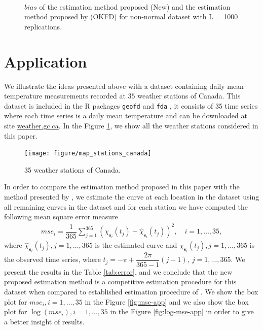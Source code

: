 \documentclass[12pt]{interact}
\theoremstyle{plain}%
\theoremstyle{definition}
\theoremstyle{remark}
\begin{document}
\begin{figure}[p]
	\\
	\caption{$bias$ of the estimation method proposed (New) and the estimation method proposed by \cite{giraldo2011ordinary} (OKFD) for non-normal dataset with L = 1000 replications.}
\end{figure}

\section{Application}\label{sec:application}

We illustrate the ideas presented above with a dataset containing daily mean temperature measurements recorded at \(35\) weather stations of Canada. This dataset is included in the R packages \texttt{geofd} \citep{ramsay2018} and \texttt{fda} \citep{giraldo2012geofd}, it consists of 35 time series where each time series is a daily mean temperature and can be downloaded at site \href{https://weather.gc.ca/}{weather.gc.ca}. In the Figure \ref{fig:weather-stations}, we show all the weather stations
considered in this paper.
\begin{figure}[htbp]
	\centering
	\texttt{[image: figure/map\_stations\_canada]} 
	\caption{35 weather stations  of Canada.}
	\label{fig:weather-stations}
\end{figure}

In order to compare the estimation method proposed in this paper with the method presented by \citet{giraldo2011ordinary}, we estimate the curve at each location in the dataset using all remaining curves in the dataset and for each station we have computed the following mean square error measure
\begin{align*}
mse_i = \dfrac{1}{365} \sum_{j=1}^{365} (\chi_{\bm{s}_i}(t_j) - \hat\chi_{\bm{s}_i}(t_j))^2, \quad i =1, \dots, 35,
\end{align*}
where \(\hat\chi_{\bm{s}_i}(t_j), j=1, \dots, 365\) is the estimated curve and \(\chi_{\bm{s}_i}(t_j), j=1, \dots, 365\) is the observed time series,
where \(t_j = -\pi + \dfrac{2\pi}{365-1}(j-1),\ j=1,\dots, 365\).
We present the results in the Table \ref{tab:error}, and we conclude that the new proposed estimation method is a competitive estimation procedure for this dataset when compared to established estimation procedure of
\citet{giraldo2011ordinary}. We show the box plot for \(mse_i, i=1, \dots, 35\) in the Figure \ref{fig:mse-app} and we also show the box plot for \(\log(mse_i), i=1, \dots, 35\) in the Figure \ref{fig:log-mse-app} in order to give a better insight of results.
\end{document}
